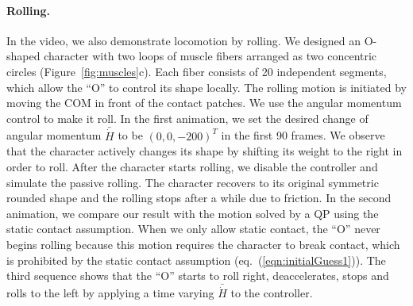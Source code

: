 \paragraph{Rolling.} In the video, we also demonstrate
locomotion by rolling. We designed an O-shaped character with two
loops of muscle fibers arranged as two concentric circles
(Figure~\ref{fig:muscles}c). Each fiber consists of 20 independent segments, which allow
the ``O'' to control its shape locally. The rolling motion is initiated by moving the COM in front of the contact patches. We use the angular momentum control to
make it roll. In the first animation, we set the desired
change of angular momentum $\bar{\dot{H}}$ to be $(0, 0, -200)^T$ in
the first 90 frames. We observe that the character actively changes its
shape by shifting its weight to the right in order to roll. After the character starts rolling,
we disable the controller
and simulate the passive rolling. The character recovers to its
original symmetric rounded shape and the rolling stops after a while
due to friction. In the second animation, we compare our result with
the motion solved by a QP using the static contact assumption.  When we only
allow static contact, the ``O'' never begins rolling because this
motion requires the character to break contact, which is prohibited by the static contact assumption (eq.~(\ref{eqn:initialGuess1})).  The third sequence
shows that the ``O'' starts to roll right, deaccelerates, stops
and rolls to the left by applying a time varying $\bar{\dot{H}}$ to
the controller.

